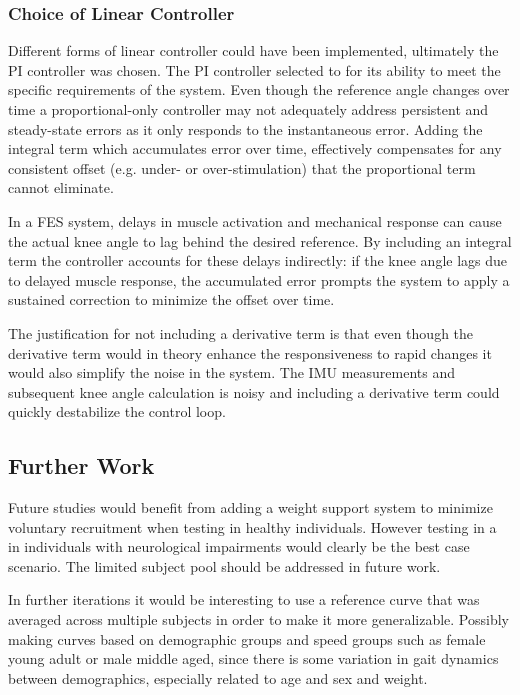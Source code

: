 \subsubsection*{Choice of Linear Controller}
Different forms of linear controller could have been implemented, ultimately the PI controller was chosen. 
The PI controller selected to for its ability to meet the specific requirements of the system.  Even though the reference angle changes over time a proportional-only controller may not adequately address persistent and steady-state errors as it only responds to the instantaneous error. Adding the integral term which accumulates error over time, effectively compensates for any consistent offset (e.g. under- or over-stimulation) that the proportional term cannot eliminate. 

In a FES system, delays in muscle activation and mechanical response can cause the actual knee angle to lag behind the desired reference. By including an integral term the controller accounts for these delays indirectly: if the knee angle lags due to delayed muscle response, the accumulated error prompts the system to apply a sustained correction to minimize the offset over time.

The justification for not including a derivative term is that even though the derivative term would in theory enhance the responsiveness to rapid changes it would also simplify the noise in the system. The IMU measurements and subsequent knee angle calculation is noisy and including a derivative term could quickly destabilize the control loop.

\subsection{Further Work}
Future studies would benefit from adding a weight support system to minimize voluntary recruitment when testing in healthy individuals. However testing in a in individuals with neurological impairments would clearly be the best case scenario. The limited subject pool should be addressed in future work.

In further iterations it would be interesting to use a reference curve that was averaged across multiple subjects in order to make it more generalizable. Possibly making curves based on demographic groups and speed groups such as female young adult or male middle aged, since there is some variation in gait dynamics between demographics, especially related to age and sex and weight.

